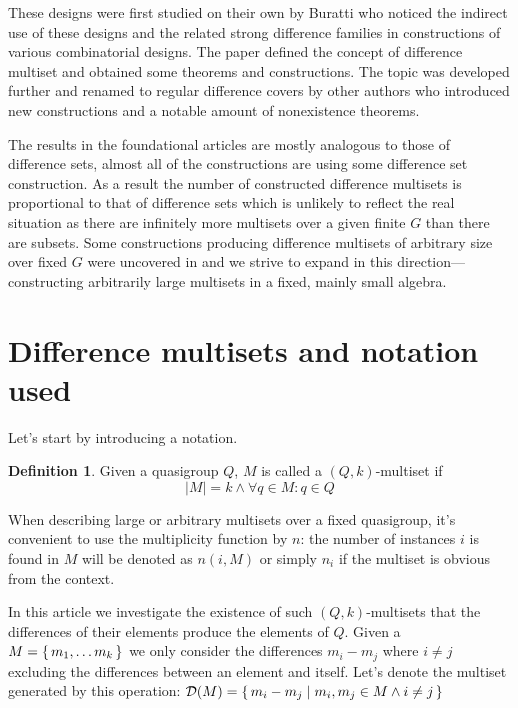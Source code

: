 \documentclass{article}
\theoremstyle{plain}
\theoremstyle{definition}
\newtheorem{definition}[theorem]{Definition}
\theoremstyle{remark}
\begin{document}
        These designs were first studied on their own by Buratti \cite{buratti1999old} who noticed the indirect use of these designs and the related strong difference families in constructions of various combinatorial designs. The paper defined the concept of difference multiset and obtained some theorems and constructions. The topic was developed further and renamed to regular difference covers by other authors \cite{arasu2005cyclic, arasu2005regular} who introduced new constructions and a notable amount of nonexistence theorems.
        
        The results in the foundational articles are mostly analogous to those of difference sets, almost all of the constructions are using some difference set construction. As a result the number of constructed difference multisets is proportional to that of difference sets which is unlikely to reflect the real situation as there are infinitely more multisets over a given finite $G$ than there are subsets. Some constructions producing difference multisets of arbitrary size over fixed $G$ were uncovered in \cite{momihara2009strong} and we strive to expand in this direction---constructing arbitrarily large multisets in a fixed, mainly small algebra.
    
	\section{Difference multisets and notation used}
    
        Let's start by introducing a notation.
        
		\begin{definition}
			\label{dms:def:ms}
			Given a quasigroup $Q$, $M$ is called a $(Q,k)$-multiset if
			\begin{equation}
				|M| = k \land \forall q \in M \colon q \in Q
			\end{equation}
		\end{definition}
	
		When describing large or arbitrary multisets over a fixed quasigroup, it's convenient to use the multiplicity function by $n$: the number of instances $i$ is found in $M$ will be denoted as $n(i,M)$ or simply $n_i$ if the multiset is obvious from the context.
	
		In this article we investigate the existence of such $(Q,k)$-multisets that the differences of their elements produce the elements of $Q$. Given a $M=\set{m_1,\ldots m_k}$ we only consider the differences $m_i-m_j$ where $i \neq j$ excluding the differences between an element and itself. Let's denote the multiset generated by this operation: $\mathcal D (M) = \set{m_i-m_j \mid m_i, m_j \in M \land i \neq j}$
	
\end{document}
